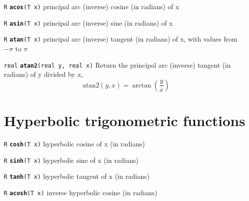 \documentclass[
  10pt,
]{book}
\begin{document}

\texttt{R} \textbf{\texttt{acos}}\texttt{(T\ x)}\newline
principal arc (inverse) cosine (in radians) of x


\texttt{R} \textbf{\texttt{asin}}\texttt{(T\ x)}\newline
principal arc (inverse) sine (in radians) of x


\texttt{R} \textbf{\texttt{atan}}\texttt{(T\ x)}\newline
principal arc (inverse) tangent (in radians) of x, with values from
\(-\pi\) to \(\pi\)


\texttt{real} \textbf{\texttt{atan2}}\texttt{(real\ y,\ real\ x)}\newline
Return the principal arc (inverse) tangent (in radians) of y divided
by x, \[ \text{atan2}(y, x) = \arctan\left(\frac{y}{x}\right) \]

\hypertarget{hyperbolic-trigonometric-functions}{%
\section{Hyperbolic trigonometric functions}\label{hyperbolic-trigonometric-functions}}


\texttt{R} \textbf{\texttt{cosh}}\texttt{(T\ x)}\newline
hyperbolic cosine of x (in radians)


\texttt{R} \textbf{\texttt{sinh}}\texttt{(T\ x)}\newline
hyperbolic sine of x (in radians)


\texttt{R} \textbf{\texttt{tanh}}\texttt{(T\ x)}\newline
hyperbolic tangent of x (in radians)


\texttt{R} \textbf{\texttt{acosh}}\texttt{(T\ x)}\newline
inverse hyperbolic cosine (in radians)
\end{document}
